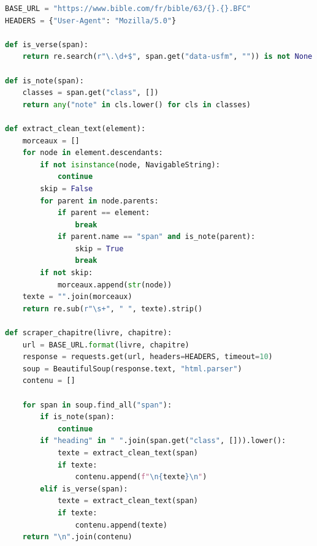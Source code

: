 \begin{lstlisting}[language=Python, caption={Extrait de récupération des chapitres bibliques depuis \href{https://Bible.com}{Bible.com}}, label={code:extrait-scraping}]
BASE_URL = "https://www.bible.com/fr/bible/63/{}.{}.BFC"
HEADERS = {"User-Agent": "Mozilla/5.0"}

def is_verse(span):
    return re.search(r"\.\d+$", span.get("data-usfm", "")) is not None

def is_note(span):
    classes = span.get("class", [])
    return any("note" in cls.lower() for cls in classes)

def extract_clean_text(element):
    morceaux = []
    for node in element.descendants:
        if not isinstance(node, NavigableString):
            continue
        skip = False
        for parent in node.parents:
            if parent == element:
                break
            if parent.name == "span" and is_note(parent):
                skip = True
                break
        if not skip:
            morceaux.append(str(node))
    texte = "".join(morceaux)
    return re.sub(r"\s+", " ", texte).strip()

def scraper_chapitre(livre, chapitre):
    url = BASE_URL.format(livre, chapitre)
    response = requests.get(url, headers=HEADERS, timeout=10)
    soup = BeautifulSoup(response.text, "html.parser")
    contenu = []

    for span in soup.find_all("span"):
        if is_note(span):
            continue
        if "heading" in " ".join(span.get("class", [])).lower():
            texte = extract_clean_text(span)
            if texte:
                contenu.append(f"\n{texte}\n")
        elif is_verse(span):
            texte = extract_clean_text(span)
            if texte:
                contenu.append(texte)
    return "\n".join(contenu)

\end{lstlisting}

